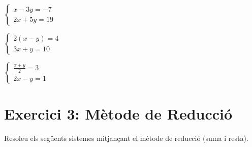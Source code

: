 \documentclass[12pt,a4paper]{article}
\begin{document}
\begin{enumerate}[label=\alph*), itemsep=1cm]
\begin{minipage}[t]{0.45\textwidth}
    \item $\begin{cases} x - 3y = -7 \\ 2x + 5y = 19 \end{cases}$
    \item $\begin{cases} 2(x-y) = 4 \\ 3x + y = 10 \end{cases}$
    \item $\begin{cases} \frac{x+y}{2} = 3 \\ 2x - y = 1 \end{cases}$
    \end{minipage}
\end{enumerate}

\newpage

\section*{Exercici 3: Mètode de Reducció}
Resoleu els següents sistemes mitjançant el mètode de reducció (suma i resta).
\end{document}
